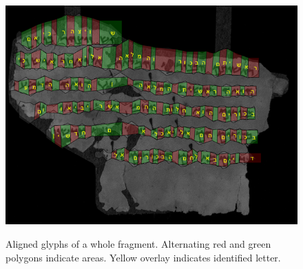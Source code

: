 \begin{figure}[t]

\includegraphics[width=1\columnwidth]{images/P702-Fg010-R-C01-R01-D12092012-T111025-LR924_012_F_rewrite._reordered_with_text._page_cutout.png}
  \label{fig:regularAlignment}
  \vspace*{-5mm} \caption{Aligned glyphs of a whole fragment. Alternating red
	and green polygons indicate areas. Yellow overlay indicates identified
	letter.} \vspace*{-5mm} \label{fig:align}
\end{figure}

